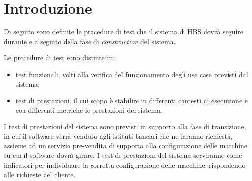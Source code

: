 
\section{Introduzione}

Di seguito sono definite le procedure di test che il sistema di HBS dovr\`a seguire durante e a seguito della fase di \emph{construction} del sistema.

Le procedure di test sono distinte in:
\begin{itemize}
	\item test funzionali, volti alla verifica del funzionamento degli use case previsti dal sistema;
	\item test di prestazioni, il cui scopo \`e stabilire in differenti contesti di esecuzione e con differenti metriche le prestazioni del sistema.
\end{itemize}

I test di prestazioni del sistema sono previsti in supporto alla fase di transizione, in cui il software verr\`a venduto agli istituti bancari che ne faranno richiesta, assieme ad un servizio pre-vendita di supporto alla configurazione delle macchine su cui il software dovr\`a girare.
I test di prestazioni del sistema serviranno come indicatori per individuare la corretta configurazione delle macchine, rispondendo alle richieste del cliente.



